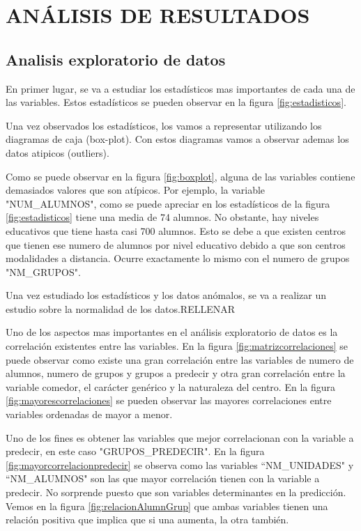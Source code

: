 \section{ANÁLISIS DE RESULTADOS}
\subsection{Analisis exploratorio de datos}
En primer lugar, se va a estudiar los estadísticos mas importantes de cada una de las variables. Estos estadísticos se pueden observar en la figura \ref{fig:estadisticos}. 

Una vez observados los estadísticos, los vamos a representar utilizando los diagramas de caja (box-plot). Con estos diagramas vamos a observar ademas los datos atipicos (outliers).

Como se puede observar en la figura \ref{fig:boxplot}, alguna de las variables contiene demasiados valores que son atípicos. Por ejemplo, la variable "NUM\_ALUMNOS", como se puede apreciar en los estadísticos de la figura \ref{fig:estadisticos} tiene una media de 74 alumnos. No obstante, hay niveles educativos que tiene hasta casi 700 alumnos. Esto se debe a que existen centros que tienen ese numero de alumnos por nivel educativo debido a que son centros modalidades a distancia. Ocurre exactamente lo mismo con el numero de grupos "NM\_GRUPOS".

Una vez estudiado los estadísticos y los datos anómalos, se va a realizar un estudio sobre la normalidad de los datos.RELLENAR

Uno de los aspectos mas importantes en el análisis exploratorio de datos es la correlación existentes entre las variables. En la figura \ref{fig:matrizcorrelaciones} se puede observar como existe una gran correlación entre las variables de numero de alumnos, numero de grupos y grupos a predecir y otra gran correlación entre la variable comedor, el carácter genérico y la naturaleza del centro. En la figura \ref{fig:mayorescorrelaciones} se pueden observar las mayores correlaciones entre variables ordenadas de mayor a menor.

Uno de los fines es obtener las variables que mejor correlacionan con la variable a predecir, en este caso "GRUPOS\_PREDECIR". En la figura \ref{fig:mayorcorrelacionpredecir} se observa como las variables ``NM\_UNIDADES" y ``NM\_ALUMNOS" son las que mayor correlación tienen con la variable a predecir. No sorprende puesto que son variables determinantes en la predicción. Vemos en la figura \ref{fig:relacionAlumnGrup} que ambas variables tienen una relación positiva que implica que si una aumenta, la otra también.







